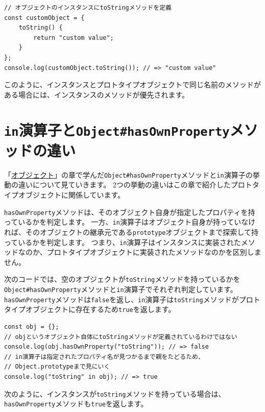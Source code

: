 \begin{lstlisting}
// オブジェクトのインスタンスにtoStringメソッドを定義
const customObject = {
    toString() {
        return "custom value";
    }
};
console.log(customObject.toString()); // => "custom value"
\end{lstlisting}

このように、インスタンスとプロトタイプオブジェクトで同じ名前のメソッドがある場合には、インスタンスのメソッドが優先されます。

\hypertarget{diff-in-operator-and-hasOwnProperty}{%
\section{\texorpdfstring{\texttt{in}演算子と\texttt{Object\#hasOwnProperty}メソッドの違い}{in演算子とObject\#hasOwnPropertyメソッドの違い}}\label{diff-in-operator-and-hasOwnProperty}}

「\hyperlink{object}{オブジェクト}」の章で学んだ\texttt{Object\#hasOwnProperty}メソッドと\texttt{in}演算子の挙動の違いについて見ていきます。
2つの挙動の違いはこの章で紹介したプロトタイプオブジェクトに関係しています。

\texttt{hasOwnProperty}メソッドは、そのオブジェクト自身が指定したプロパティを持っているかを判定します。
一方、\texttt{in}演算子はオブジェクト自身が持っていなければ、そのオブジェクトの継承元である\texttt{prototype}オブジェクトまで探索して持っているかを判定します。
つまり、\texttt{in}演算子はインスタンスに実装されたメソッドなのか、プロトタイプオブジェクトに実装されたメソッドなのかを区別しません。

次のコードでは、空のオブジェクトが\texttt{toString}メソッドを持っているかを\texttt{Object\#hasOwnProperty}メソッドと\texttt{in}演算子でそれぞれ判定しています。
\texttt{hasOwnProperty}メソッドは\texttt{false}を返し、\texttt{in}演算子は\texttt{toString}メソッドがプロトタイプオブジェクトに存在するため\texttt{true}を返します。

\begin{lstlisting}
const obj = {};
// objというオブジェクト自体にtoStringメソッドが定義されているわけではない
console.log(obj.hasOwnProperty("toString")); // => false
// in演算子は指定されたプロパティ名が見つかるまで親をたどるため、
// Object.prototypeまで見にいく
console.log("toString" in obj); // => true
\end{lstlisting}

次のように、インスタンスが\texttt{toString}メソッドを持っている場合は、\texttt{hasOwnProperty}メソッドも\texttt{true}を返します。

